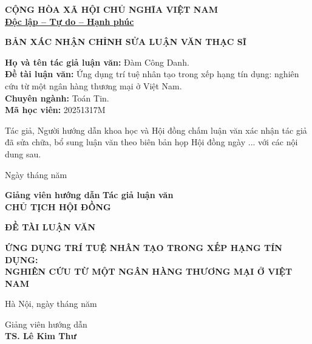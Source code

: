 \documentclass[a4paper]{report}
\begin{document}
\newpage
\thispagestyle{empty}
\begin{center}
\fontsize{15pt}{18pt}\selectfont \bf{CỘNG HÒA XÃ HỘI CHỦ NGHĨA VIỆT NAM}\\
\underline{Độc lập – Tự do – Hạnh phúc}
 
\vspace{1 cm}
\fontsize{18pt}{21pt}
\bf{BẢN XÁC NHẬN CHỈNH SỬA LUẬN VĂN THẠC SĨ}
\end{center}
\vspace{0.5 cm} 
 \textbf{Họ và tên tác giả luận văn:} Đàm Công Danh.\\ 
\textbf{Đề tài luận văn:} Ứng dụng trí tuệ nhân tạo trong xếp hạng tín dụng: nghiên cứu từ một ngân hàng thương mại ở Việt Nam.\\
\textbf{Chuyên ngành:} Toán Tin.\\
\textbf{Mã học viên:} 20251317M
\vspace{0.5 cm}
\par
Tác giả, Người hướng dẫn khoa học và Hội đồng chấm luận văn xác nhận tác giả đã sửa chữa, bổ sung luận văn theo biên bản họp Hội đồng ngày ...  với các nội dung sau.
\begin{flushright}
   Ngày  tháng  năm 
    \textbf{}\\[0.1 cm]
\end{flushright}
\begin{center}
  \textbf{Giảng viên hướng dẫn}\hspace{5.5cm}  \textbf{Tác giả luận văn}\\[3 cm]

    \bf \textbf{CHỦ TỊCH HỘI ĐỒNG}
\end{center}

\newpage
\thispagestyle{empty} 
\begin{center}
\fontsize{15pt}{18pt}\selectfont 
 \bf{ĐỀ TÀI LUẬN VĂN}   
\end{center}
\begin{center}
\bf ỨNG DỤNG TRÍ TUỆ NHÂN TẠO TRONG XẾP HẠNG TÍN DỤNG: \\
NGHIÊN CỨU TỪ MỘT NGÂN HÀNG THƯƠNG MẠI Ở VIỆT NAM
\end{center}
\vspace{10 cm}
\begin{flushright}
    Hà Nội, ngày tháng năm 
    \textbf{}\\[0.1 cm]
\end{flushright}
\begin{center}
   \hspace{8.8cm}  Giảng viên hướng dẫn\\[3 cm]

   \hspace{8.8cm} \bf TS. Lê Kim Thư
\end{center}
\end{document}
